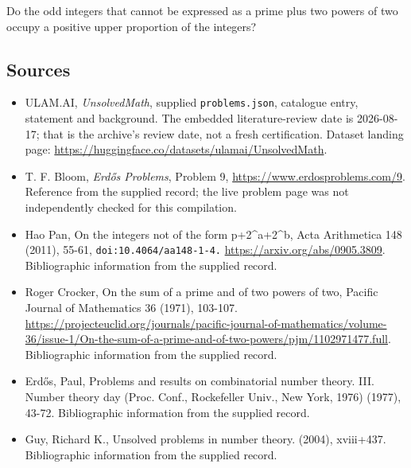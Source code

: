 \documentclass[11pt,a4paper]{article}
\begin{document}
Do the odd integers that cannot be expressed as a prime plus two powers of two occupy a positive upper proportion of the integers?

\subsection{Sources}

{\small

\begin{itemize}

\item[\hypertarget{source:statement:1}{S1}] ULAM.AI, \emph{UnsolvedMath}, supplied \texttt{problems.json}, catalogue entry, statement and background. The embedded literature-review date is 2026-08-17; that is the archive’s review date, not a fresh certification. Dataset landing page: \url{https://huggingface.co/datasets/ulamai/UnsolvedMath}.

\item[\hypertarget{source:statement:2}{S2}] T. F. Bloom, \emph{Erdős Problems}, Problem 9, \url{https://www.erdosproblems.com/9}. Reference from the supplied record; the live problem page was not independently checked for this compilation.

\item[\hypertarget{source:statement:3}{S3}] Hao Pan, On the integers not of the form p+2\textasciicircum{}a+2\textasciicircum{}b, Acta Arithmetica 148 (2011), 55-61, \nolinkurl{doi:10.4064/aa148-1-4.} \url{https://arxiv.org/abs/0905.3809}. Bibliographic information from the supplied record.

\item[\hypertarget{source:statement:4}{S4}] Roger Crocker, On the sum of a prime and of two powers of two, Pacific Journal of Mathematics 36 (1971), 103-107. \url{https://projecteuclid.org/journals/pacific-journal-of-mathematics/volume-36/issue-1/On-the-sum-of-a-prime-and-of-two-powers/pjm/1102971477.full}. Bibliographic information from the supplied record.

\item[\hypertarget{source:statement:5}{S5}] Erd\H{o}s, Paul, Problems and results on combinatorial number theory. III. Number theory day (Proc. Conf., Rockefeller Univ., New York, 1976) (1977), 43-72. Bibliographic information from the supplied record.

\item[\hypertarget{source:statement:6}{S6}] Guy, Richard K., Unsolved problems in number theory. (2004), xviii+437. Bibliographic information from the supplied record.

\end{itemize}

}

\label{end:statement}
\end{document}
